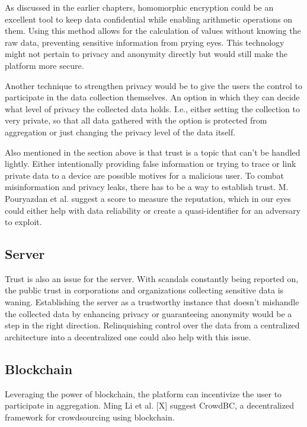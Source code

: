 As discussed in the earlier chapters, homomorphic encryption could be an excellent tool to keep data confidential while enabling arithmetic operations on them. Using this method allows for the calculation of values without knowing the raw data, preventing sensitive information from prying eyes. This technology might not pertain to privacy and anonymity directly but would still make the platform more secure.

Another technique to strengthen privacy would be to give the users the control to participate in the data collection themselves. An option in which they can decide what level of privacy the collected data holds. I.e., either setting the collection to very private, so that all data gathered with the option is protected from aggregation or just changing the privacy level of the data itself.

Also mentioned in the section above is that trust is a topic that can't be handled lightly. Either intentionally providing false information or trying to trace or link private data to a device are possible motives for a malicious user. To combat misinformation and privacy leaks, there has to be a way to establish trust. M. Pouryazdan et al. suggest a score to measure the reputation, which in our eyes could either help with data reliability or create a quasi-identifier for an adversary to exploit.

\subsection{Server}
Trust is also an issue for the server. With scandals constantly being reported on, the public trust in corporations and organizations collecting sensitive data is waning. Establishing the server as a trustworthy instance that doesn't mishandle the collected data by enhancing privacy or guaranteeing anonymity would be a step in the right direction. Relinquishing control over the data from a centralized architecture into a decentralized one could also help with this issue.

\subsection{Blockchain}
Leveraging the power of blockchain, the platform can incentivize the user to participate in aggregation. Ming Li et al. [X] suggest CrowdBC, a decentralized framework for crowdsourcing using blockchain. 

